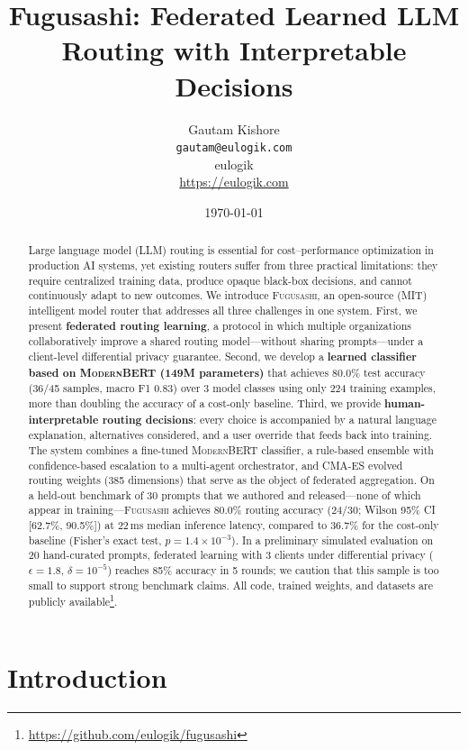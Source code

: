 \documentclass[11pt,a4paper]{article}
\title{\textbf{Fugusashi: Federated Learned LLM Routing with Interpretable Decisions}}
\author{
  Gautam Kishore \\
  \texttt{gautam@eulogik.com} \\
  eulogik \\
  \small{\url{https://eulogik.com}}
}
\date{\today}
\newcommand{\fugusashi}{\textsc{Fugusashi}}
\newcommand{\modernbert}{\textsc{ModernBERT}}
\begin{document}
\maketitle

\begin{abstract}
Large language model (LLM) routing is essential for cost--performance optimization in production AI systems, yet existing routers suffer from three practical limitations: they require centralized training data, produce opaque black-box decisions, and cannot continuously adapt to new outcomes.
We introduce \fugusashi{}, an open-source (MIT) intelligent model router that addresses all three challenges in one system.
First, we present \textbf{federated routing learning}, a protocol in which multiple organizations collaboratively improve a shared routing model---without sharing prompts---under a client-level differential privacy guarantee.
Second, we develop a \textbf{learned classifier based on \modernbert{} (149M parameters)} that achieves 80.0\% test accuracy (36/45 samples, macro F1 0.83) over 3 model classes using only 224 training examples, more than doubling the accuracy of a cost-only baseline.
Third, we provide \textbf{human-interpretable routing decisions}: every choice is accompanied by a natural language explanation, alternatives considered, and a user override that feeds back into training.
The system combines a fine-tuned \modernbert{} classifier, a rule-based ensemble with confidence-based escalation to a multi-agent orchestrator, and CMA-ES evolved routing weights (385 dimensions) that serve as the object of federated aggregation.
On a held-out benchmark of 30 prompts that we authored and released---none of which appear in training---\fugusashi{} achieves 80.0\% routing accuracy (24/30; Wilson 95\% CI [62.7\%, 90.5\%]) at 22\,ms median inference latency, compared to 36.7\% for the cost-only baseline (Fisher's exact test, $p = 1.4 \times 10^{-3}$).
In a preliminary simulated evaluation on 20 hand-curated prompts, federated learning with 3 clients under differential privacy ($\epsilon = 1.8$, $\delta = 10^{-5}$) reaches 85\% accuracy in 5 rounds; we caution that this sample is too small to support strong benchmark claims.
All code, trained weights, and datasets are publicly available\footnote{\url{https://github.com/eulogik/fugusashi}}.
\end{abstract}

\section{Introduction}
\end{document}
